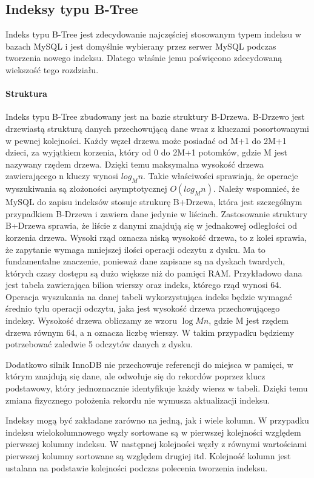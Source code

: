 \subsection{Indeksy typu B-Tree}
Indeks typu B-Tree jest zdecydowanie najczęściej stosowanym typem indeksu w bazach MySQL i jest domyślnie wybierany przez serwer MySQL podczas tworzenia nowego indeksu. Dlatego właśnie jemu poświęcono zdecydowaną wiekszość tego rozdziału.

\paragraph{Struktura}\mbox{}

Indeks typu B-Tree zbudowany jest na bazie struktury B-Drzewa. B-Drzewo jest drzewiastą strukturą danych przechowującą dane wraz z kluczami posortowanymi w pewnej kolejności. Każdy węzeł drzewa może posiadać od M+1 do 2M+1 dzieci, za wyjątkiem korzenia, który od 0 do 2M+1 potomków, gdzie M jest nazywany rzędem drzewa. Dzięki temu maksymalna wysokość drzewa zawierającego n kluczy wynosi $log_M n$. Takie właściwości sprawiają, że operacje wyszukiwania są złożoności asymptotycznej $O(log_M n)$. Należy wspomnieć, że MySQL do zapisu indeksów stosuje strukurę B+Drzewa, która jest szczególnym przypadkiem B-Drzewa i zawiera dane jedynie w liściach.
Zastosowanie struktury B+Drzewa sprawia, że liście z danymi znajdują się w jednakowej odległości od korzenia drzewa. Wysoki rząd oznacza niską wysokość drzewa, to z kolei sprawia, że zapytanie wymaga mniejszej ilości operacji odczytu z dysku. Ma to fundamentalne znaczenie, ponieważ dane zapisane są na dyskach twardych, których czasy dostępu są dużo większe niż do pamięci RAM. Przykładowo dana jest tabela zawierająca bilion wierszy oraz indeks, którego rząd wynosi 64. Operacja wyszukania na danej tabeli wykorzystująca indeks będzie wymagać średnio tylu operacji odczytu, jaka jest wysokość drzewa przechowującego indeksy. Wysokość drzewa obliczamy ze wzoru $\log M n$, gdzie M jest rzędem drzewa równym 64, a n oznacza liczbę wierszy. W takim przypadku będziemy potrzebować zaledwie 5 odczytów danych z dysku. 

Dodatkowo silnik InnoDB nie przechowuje referencji do miejsca w pamięci, w którym znajdują się dane, ale odwołuje się do rekordów poprzez klucz podstawowy, który jednoznacznie identyfikuje każdy wiersz w tabeli. Dzięki temu zmiana fizycznego położenia rekordu nie wymusza aktualizacji indeksu. 

Indeksy mogą być zakładane zarówno na jedną, jak i wiele kolumn. W przypadku indeksu wielokolumnowego węzły sortowane są w pierwszej kolejności względem pierwszej kolumny indeksu. W następnej kolejności węzły z równymi wartościami pierwszej kolumny sortowane są względem drugiej itd. Kolejność kolumn jest ustalana na podstawie kolejności podczas polecenia tworzenia indeksu.

